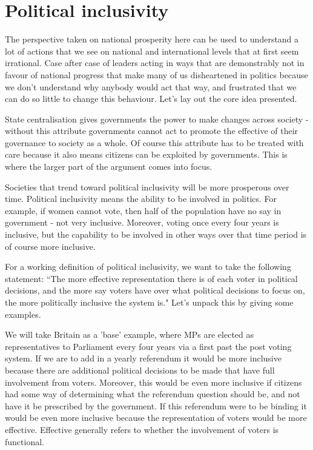 \documentclass[twoside]{article}
\theoremstyle{definition}
\begin{document}
\section{Political inclusivity}

The perspective taken on national prosperity here can be used to understand a lot of actions that we see on national and international levels that at first seem irrational. Case after case of leaders acting in ways that are demonstrably not in favour of national progress that make many of us disheartened in politics because we don’t understand why anybody would act that way, and frustrated that we can do so little to change this behaviour. Let’s lay out the core idea presented.

State centralisation gives governments the power to make changes across society - without this attribute governments cannot act to promote the effective of their governance to society as a whole. Of course this attribute has to be treated with care because it also means citizens can be exploited by governments. This is where the larger part of the argument comes into focus.

Societies that trend toward political inclusivity will be more prosperous over time. Political inclusivity means the ability to be involved in politics. For example, if women cannot vote, then half of the population have no say in government - not very inclusive. Moreover, voting once every four years is inclusive, but the capability to be involved in other ways over that time period is of course more inclusive.

For a working definition of political inclusivity, we want to take the following statement: ``The more effective representation there is of each voter in political decisions, and the more say voters have over what political decisions to focus on, the more politically inclusive the system is." Let's unpack this by giving some examples.

We will take Britain as a 'base' example, where MPs are elected as representatives to Parliament every four years via a first past the post voting system. If we are to add in a yearly referendum it would be more inclusive because there are additional political decisions to be made that have full involvement from voters. Moreover, this would be even more inclusive if citizens had some way of determining what the referendum question should be, and not have it be prescribed by the government. If this referendum were to be binding it would be even more inclusive because the representation of voters would be more effective. Effective generally refers to whether the involvement of voters is functional.
\end{document}

